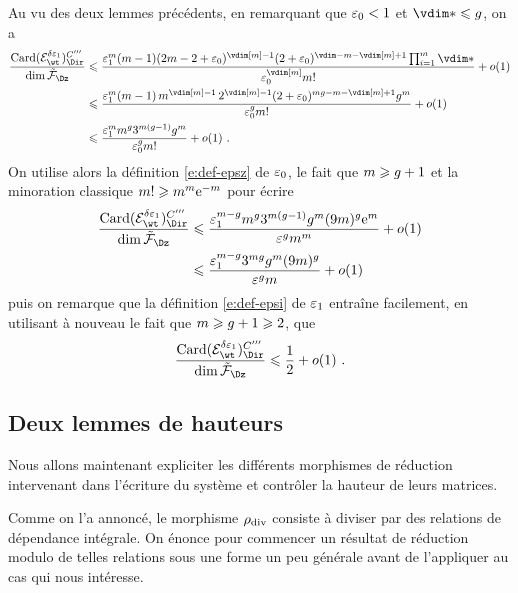 Au vu des deux lemmes précédents, en remarquant que \( \varepsilon\sb0 < 1 \) et \(
  \vdim* \le \genre \), on a
\begin{align}
  \frac {\card (\stairs)\Ciii} {\dim \fspace}
  & \le
  \frac {
    \epsi^\puiss (\puiss-1)
    (2\puiss - 2 + \epsz) ^{\vdim[\puiss]-1}
    (2 + \epsz) ^{\vdim - \puiss - \vdim[\puiss] + 1}
    \prod\fctrange \vdim*
  }{
    \epsz^{\vdim[\puiss]} \puiss!
  }
  + o(1)
  \\ & \le
  \frac {
    \epsi^\puiss (\puiss-1)
    \, \puiss ^{\vdim[\puiss]-1}
    \, 2 ^{\vdim[\puiss]-1}
    (2 + \epsz) ^{\puiss\genre - \puiss - \vdim[\puiss] + 1}
    \genre^\puiss
  }{
    \epsz^\genre \puiss!
  }
  + o(1)
  \\ & \le
  \frac {
    \epsi^\puiss
    \puiss ^{\genre}
    3 ^{\puiss (\genre-1)}
    \genre^\puiss
  }{
    \epsz^\genre \puiss!
  }
  + o(1)
  \pmm.
\end{align}
On utilise alors la définition \eqref{e:def-epsz} de \( \varepsilon\sb0 \), le fait que
\( m \geqslant g + 1 \) et la minoration classique \( m! \geqslant
  m^m \mathrm e^{-m} \) pour écrire
\begin{align}
  \frac {\card (\stairs)\Ciii} {\dim \fspace}
  & \le
  \frac {
    \epsi^{\puiss-\genre}
    \puiss ^{\genre}
    3 ^{\puiss (\genre-1)}
    \genre^\puiss
    (9\puiss)^\genre
    \expb^\puiss
  }{
    \eps^\genre \puiss^\puiss
  }
  + o(1)
  \\ & \le
  \frac {
    \epsi^{\puiss-\genre}
    3 ^{\puiss \genre}
    \genre^\puiss
    (9\puiss)^\genre
  }{
    \eps^\genre \puiss
  }
  + o(1)
\end{align}
puis on remarque que la définition \eqref{e:def-epsi} de \( \varepsilon\sb1 \) entraîne
facilement, en utilisant à nouveau le fait que \( m \geqslant g + 1 \geqslant 2
\), que
\begin{equation} \label{e:good-codim}
  \frac {\card (\stairs)\Ciii} {\dim \fspace}
  \le
  \frac12
  + o(1)
  \pmm.
\end{equation}



\subsection{Deux lemmes de hauteurs}

Nous allons maintenant expliciter les différents morphismes de réduction
intervenant dans l'écriture du système et contrôler la hauteur de leurs
matrices.

Comme on l'a annoncé, le morphisme \( \rho\sb{\mathrm{div }} \) consiste à diviser par des
relations de dépendance intégrale. On énonce pour commencer un résultat de
réduction modulo de telles relations sous une forme un peu générale avant de
l'appliquer au cas qui nous intéresse.


